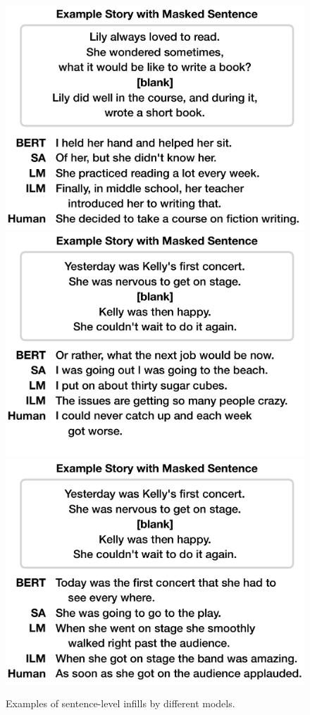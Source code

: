 \begin{figure}[h]
\centering
\includegraphics[width=1\linewidth]{figures/ilm_example_story1.pdf}
\includegraphics[width=1\linewidth]{figures/ilm_example_story2.pdf}
\includegraphics[width=1\linewidth]{figures/ilm_example_story3.pdf}
\caption{Examples of sentence-level infills by different models.}\label{fig:more_examples}
\end{figure}